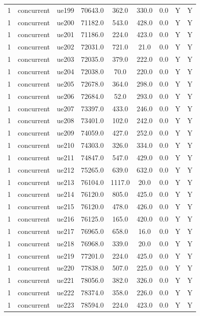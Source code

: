 \begin{table}[ht]
\begin{tabular}{|c|c|c|c|c|c|c|c|c|}
1 & concurrent & ue199 & 70643.0 & 362.0 & 330.0 & 0.0 & Y & Y \\
1 & concurrent & ue200 & 71182.0 & 543.0 & 428.0 & 0.0 & Y & Y \\
1 & concurrent & ue201 & 71186.0 & 224.0 & 423.0 & 0.0 & Y & Y \\
1 & concurrent & ue202 & 72031.0 & 721.0 & 21.0 & 0.0 & Y & Y \\
1 & concurrent & ue203 & 72035.0 & 379.0 & 222.0 & 0.0 & Y & Y \\
1 & concurrent & ue204 & 72038.0 & 70.0 & 220.0 & 0.0 & Y & Y \\
1 & concurrent & ue205 & 72678.0 & 364.0 & 298.0 & 0.0 & Y & Y \\
1 & concurrent & ue206 & 72684.0 & 52.0 & 293.0 & 0.0 & Y & Y \\
1 & concurrent & ue207 & 73397.0 & 433.0 & 246.0 & 0.0 & Y & Y \\
1 & concurrent & ue208 & 73401.0 & 102.0 & 242.0 & 0.0 & Y & Y \\
1 & concurrent & ue209 & 74059.0 & 427.0 & 252.0 & 0.0 & Y & Y \\
1 & concurrent & ue210 & 74303.0 & 326.0 & 334.0 & 0.0 & Y & Y \\
1 & concurrent & ue211 & 74847.0 & 547.0 & 429.0 & 0.0 & Y & Y \\
1 & concurrent & ue212 & 75265.0 & 639.0 & 632.0 & 0.0 & Y & Y \\
1 & concurrent & ue213 & 76104.0 & 1117.0 & 20.0 & 0.0 & Y & Y \\
1 & concurrent & ue214 & 76120.0 & 805.0 & 425.0 & 0.0 & Y & Y \\
1 & concurrent & ue215 & 76120.0 & 478.0 & 426.0 & 0.0 & Y & Y \\
1 & concurrent & ue216 & 76125.0 & 165.0 & 420.0 & 0.0 & Y & Y \\
1 & concurrent & ue217 & 76965.0 & 658.0 & 16.0 & 0.0 & Y & Y \\
1 & concurrent & ue218 & 76968.0 & 339.0 & 20.0 & 0.0 & Y & Y \\
1 & concurrent & ue219 & 77201.0 & 224.0 & 425.0 & 0.0 & Y & Y \\
1 & concurrent & ue220 & 77838.0 & 507.0 & 225.0 & 0.0 & Y & Y \\
1 & concurrent & ue221 & 78056.0 & 382.0 & 326.0 & 0.0 & Y & Y \\
1 & concurrent & ue222 & 78374.0 & 358.0 & 226.0 & 0.0 & Y & Y \\
1 & concurrent & ue223 & 78594.0 & 224.0 & 423.0 & 0.0 & Y & Y \\

\end{tabular}
\end{table}

